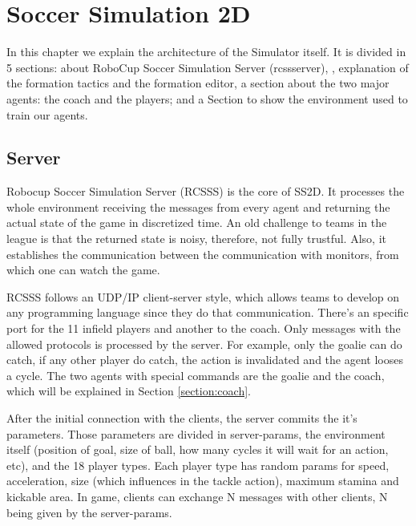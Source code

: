 \chapter{Soccer Simulation 2D}\label{chapter:ss2d}
In this chapter we explain the architecture of the Simulator itself. It is divided in 5 sections: about RoboCup Soccer Simulation Server (rcssserver), \cite{rcssserver}, explanation of the formation tactics and the formation editor, a section about the two major agents: the coach and the players; and a Section to show the environment used to train our agents.

\section{Server}\label{section:rcssserver}
Robocup Soccer Simulation Server (RCSSS) is the core of SS2D. It processes the whole environment receiving the messages from every agent and returning the actual state of the game in discretized time. An old challenge to teams in the league is that the returned state is noisy, therefore, not fully trustful. Also, it establishes the communication between the communication with monitors, from which one can watch the game. 

RCSSS follows an UDP/IP client-server style, which allows teams to develop on any programming language since they do that communication. There's an specific port for the 11 infield players and another to the coach. Only messages with the allowed protocols is processed by the server. For example, only the goalie can do catch, if any other player do catch, the action is invalidated and the agent looses a cycle. The two agents with special commands are the goalie and the coach, which will be explained in Section \ref{section:coach}.  

After the initial connection with the clients, the server commits the it's parameters. Those parameters are divided in server-params, the environment itself (position of goal, size of ball, how many cycles it will wait for an action, etc), and the 18 player types. Each player type has random params for speed, acceleration, size (which influences in the tackle action), maximum stamina and kickable area. In game, clients can exchange N messages with other clients, N being given by the server-params.

